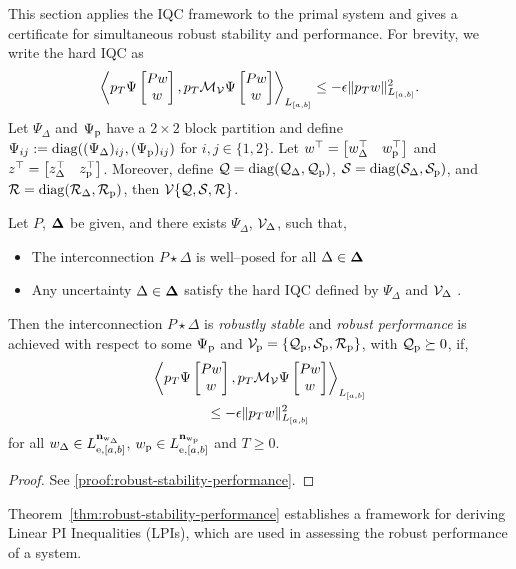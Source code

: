 This section applies the IQC framework to the primal system and gives a
certificate for simultaneous robust stability and performance. For brevity,
we write the hard IQC as
\begin{equation*}
    \left\langle p_T \Psi\begin{bmatrix}Pw \\ w\end{bmatrix}, p_T \mathcal{M}_{\mathcal{V}}\Psi\begin{bmatrix}Pw \\ w\end{bmatrix} \right\rangle_{L_{[a,b]}} \leq -\epsilon \|p_T w\|^2_{L_{[a,b]}}.
\end{equation*}
Let $\Psi_\Delta$ and $\Psi_{{\mathrm{p}}}$ have a $2\times2$ block partition and define
$\Psi_{ij}:=\operatorname{diag}((\Psi_\Delta)_{ij},(\Psi_{{\mathrm{p}}})_{ij})$ for
$i,j\in\{1,2\}$. Let $w^\top=\begin{bmatrix}w_\Delta^\top & w_{{\mathrm{p}}}^\top\end{bmatrix}$ and $z^\top=\begin{bmatrix}z_\Delta^\top & z_{{\mathrm{p}}}^\top\end{bmatrix}$.
Moreover, define $\mathcal{Q} = \operatorname{diag}(\mathcal{Q}_\Delta, \mathcal{Q}_{{\mathrm{p}}})$,
$\mathcal{S} = \operatorname{diag}(\mathcal{S}_\Delta, \mathcal{S}_{{\mathrm{p}}})$, and
$\mathcal{R} = \operatorname{diag}(\mathcal{R}_\Delta, \mathcal{R}_{{\mathrm{p}}})$, then
$\mathcal{V}\{\mathcal{Q}, \mathcal{S}, \mathcal{R}\}$.

\begin{theorem}\label{thm:robust-stability-performance}
Let $P$, $\mathbf{\Delta}$ be given, and there exists $\Psi_\Delta$,
${\mathcal{V}_\Delta}$, such that,
\begin{itemize}
\item The interconnection $P\star\Delta$ is well--posed for all
$\Delta\in\mathbf{\Delta}$
\item Any uncertainty
$\Delta\in\mathbf{\Delta}$ satisfy the hard IQC defined by $\Psi_\Delta$ and $\mathcal{V}_\Delta$ .
\end{itemize}
Then the interconnection $P \star \Delta$ is \emph{robustly stable} and
\emph{robust performance} is achieved with respect to some $\Psi_{{\mathrm{p}}}$ and
${{\mathcal{V}}_{{\mathrm{p}}}} =\{\mathcal{Q}_{{\mathrm{p}}}, \mathcal{S}_{{\mathrm{p}}}, \mathcal{R}_{{\mathrm{p}}}\}$, with
$\mathcal{Q}_{{\mathrm{p}}} \succeq 0$, if,
\begin{equation}\label{eq:robust-condition}
\begin{gathered}
\left\langle p_T\Psi\begin{bmatrix}Pw \\ w\end{bmatrix}, p_T\mathcal{M}_{\mathcal{V}}\Psi\begin{bmatrix}Pw \\ w\end{bmatrix} \right\rangle_{L_{[a,b]}} \\
\leq
-\epsilon
\|p_Tw\|^2_{L_{[a,b]}}
\end{gathered}
\end{equation}
for all $w_\Delta \in L_{{\mathrm{e}},[a,b]}^{\mathbf{n}_{{\mathrm{w}}_\Delta}}$,
$w_{{\mathrm{p}}} \in L_{{\mathrm{e}},[a,b]}^{\mathbf{n}_{{\mathrm{w}}_{{\mathrm{p}}}}}$ and $T \geq 0$.
\end{theorem}
\begin{proof}
See \ref{proof:robust-stability-performance}.
\end{proof}
Theorem~\ref{thm:robust-stability-performance} establishes a framework for deriving Linear PI
Inequalities (LPIs), which are used in assessing the robust performance of a
system.
